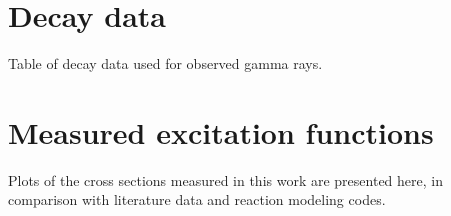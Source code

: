 \documentclass[3p]{elsarticle}
\begin{document}
% 
% 
\appendix


\section{Decay data} \label{data}
% 
Table of decay data used for observed gamma rays. 
% 
% 
\section{Measured excitation functions} \label{fit_figures}

Plots of the cross sections measured in this work are presented here, in comparison with literature data and reaction modeling codes.
% 
% 



% 
% 
% 
% 

% 










\end{document}
